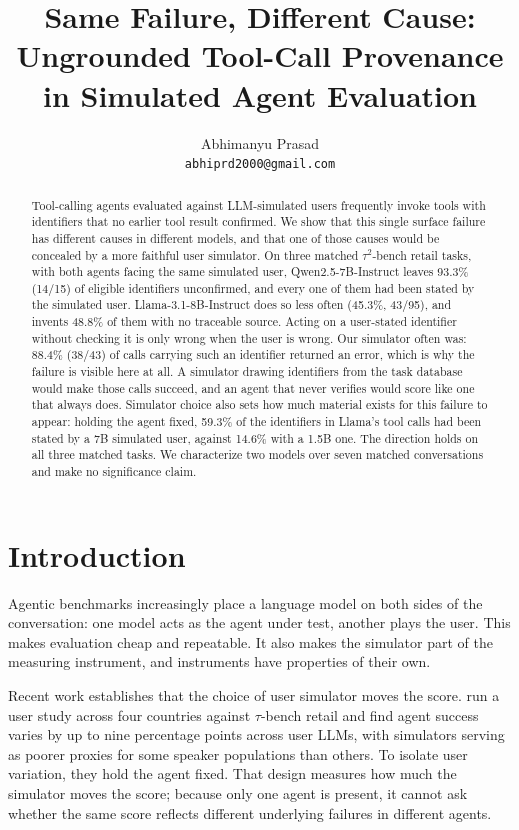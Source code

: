 \documentclass{article}
\title{Same Failure, Different Cause: Ungrounded Tool-Call Provenance in Simulated Agent Evaluation}
\author{%
  Abhimanyu Prasad \\
  \texttt{abhiprd2000@gmail.com} \\
}
\begin{document}
\maketitle

\begin{abstract}
Tool-calling agents evaluated against LLM-simulated users frequently invoke tools with identifiers that no earlier tool result confirmed. We show that this single surface failure has different causes in different models, and that one of those causes would be concealed by a more faithful user simulator. On three matched $\tau^2$-bench retail tasks, with both agents facing the same simulated user, Qwen2.5-7B-Instruct leaves 93.3\% (14/15) of eligible identifiers unconfirmed, and every one of them had been stated by the simulated user. Llama-3.1-8B-Instruct does so less often (45.3\%, 43/95), and invents 48.8\% of them with no traceable source. Acting on a user-stated identifier without checking it is only wrong when the user is wrong. Our simulator often was: 88.4\% (38/43) of calls carrying such an identifier returned an error, which is why the failure is visible here at all. A simulator drawing identifiers from the task database would make those calls succeed, and an agent that never verifies would score like one that always does. Simulator choice also sets how much material exists for this failure to appear: holding the agent fixed, 59.3\% of the identifiers in Llama's tool calls had been stated by a 7B simulated user, against 14.6\% with a 1.5B one. The direction holds on all three matched tasks. We characterize two models over seven matched conversations and make no significance claim.
\end{abstract}

\section{Introduction}

Agentic benchmarks increasingly place a language model on both sides of the conversation: one model acts as the agent under test, another plays the user. This makes evaluation cheap and repeatable. It also makes the simulator part of the measuring instrument, and instruments have properties of their own.

Recent work establishes that the choice of user simulator moves the score. \citet{seshadri2026lost} run a user study across four countries against $\tau$-bench retail and find agent success varies by up to nine percentage points across user LLMs, with simulators serving as poorer proxies for some speaker populations than others. To isolate user variation, they hold the agent fixed. That design measures how much the simulator moves the score; because only one agent is present, it cannot ask whether the same score reflects different underlying failures in different agents.
\end{document}
